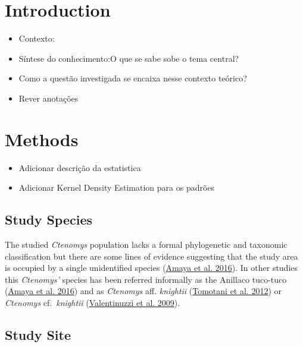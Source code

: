 \documentclass[english,msc,numbers,hidelinks]{coppe}
\providecommand{\tightlist}{%
  \setlength{\itemsep}{0pt}\setlength{\parskip}{0pt}}
\begin{document}
  \hypertarget{introduction}{%
  \section{Introduction}\label{introduction}}
  \begin{itemize}
  \tightlist
  \item
    Contexto:
  \item
    Síntese do conhecimento:O que se sabe sobe o tema central?
  \item
    Como a questão investigada se encaixa nesse contexto teórico?
  \item
    Rever anotações
  \end{itemize}
  \hypertarget{methods}{%
  \section{Methods}\label{methods}}
  \begin{itemize}
  \tightlist
  \item
    Adicionar descrição da estatistica
  \item
    Adicionar Kernel Density Estimation para os padrões
  \end{itemize}
  \hypertarget{study-species}{%
  \subsection{Study Species}\label{study-species}}

  The studied \emph{Ctenomys} population lacks a formal phylogenetic and taxonomic classification but there are some lines of evidence suggesting that the study area is occupied by a single unidentified species (\protect\hyperlink{ref-amaya2016}{Amaya et al. 2016}). In other studies this \emph{Ctenomys'} species has been referred informally as the Anillaco tuco-tuco (\protect\hyperlink{ref-amaya2016}{Amaya et al. 2016}) and as \emph{Ctenomys} aff. \emph{knightii} (\protect\hyperlink{ref-tomotani2012}{Tomotani et al. 2012}) or \emph{Ctenomys} cf.~\emph{knightii} (\protect\hyperlink{ref-valentinuzzi2009}{Valentinuzzi et al. 2009}).

  \hypertarget{study-site}{%
  \subsection{Study Site}\label{study-site}}
\end{document}
